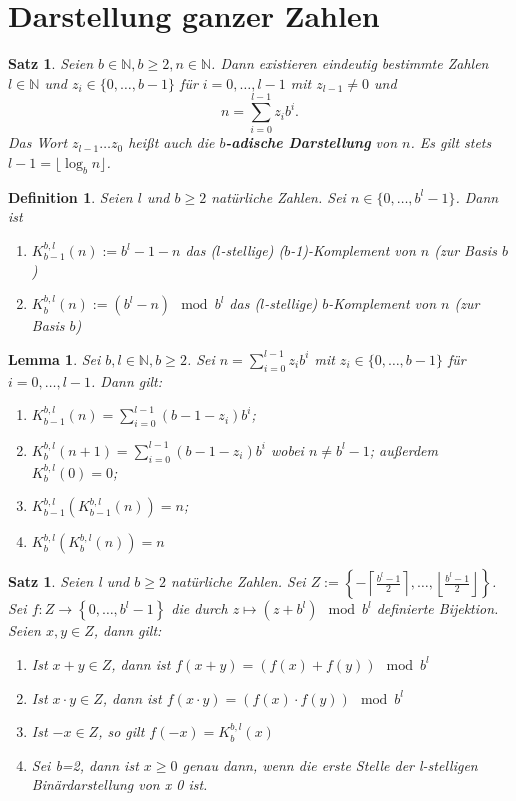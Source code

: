 \documentclass[12pt,a4paper]{article}
\theoremstyle{plain}
\newtheorem{Satz}[Theorem]{Satz}
\newtheorem{Lemma}[Theorem]{Lemma}
\newtheorem{Definition}[Theorem]{Definition}
\newcommand{\herv}[1]{{\emph{\textbf{#1}}}}
\newcommand{\N}{\mathbb{N}}
\numberwithin{equation}{section}
\begin{document}
\section{Darstellung ganzer Zahlen}
\begin{Satz}
Seien $b\in \N, b\geq 2, n\in \N$. Dann existieren eindeutig bestimmte Zahlen $l \in \N$ und $z_i\in\{0,\ldots,b-1\}$ für $i=0,\ldots,l-1$ mit $z_{l-1}\neq 0$ und \\
\[n=\sum_{i=0}^{l-1}{z_ib^i}.\] Das Wort $z_{l-1}\ldots z_0$ heißt auch die \herv{$b$-adische Darstellung} von $n$. Es gilt stets $l-1=\lfloor\log_b n\rfloor$.
\end{Satz}
\begin{Definition}
Seien $l$ und $b\geq 2$ natürliche Zahlen. Sei $n\in \{0,\ldots,b^l-1\}$. Dann ist
\renewcommand{\labelenumi}{\emph{(\alph{enumi})}}
\begin{enumerate}
\item $K_{b-1}^{b,l}(n):=b^l-1-n$ das ($l$-stellige) ($b$-1)-Komplement von $n$ (zur Basis $b$)
\item $K_b^{b,l}(n):=\left(b^l-n\right)\mod b^l$ das ($l$-stellige) $b$-Komplement von $n$ (zur Basis $b$)
\end{enumerate}
\end{Definition}
\begin{Lemma}
Sei $b,l\in\N, b\geq 2$. Sei $n=\sum_{i=0}^{l-1}{z_ib^i}$ mit $z_i\in\{0,\ldots,b-1\}$ für $i=0,\ldots,l-1$. Dann gilt:
\renewcommand{\labelenumi}{\emph{(\roman{enumi})}}
\begin{enumerate}
\item $K_{b-1}^{b,l}(n)=\sum_{i=0}^{l-1}{\left(b-1-z_i\right) b^i}$;
\item $K_b^{b,l}(n+1)=\sum_{i=0}^{l-1}{\left(b-1-z_i\right) b^i}$ wobei $n\neq b^l-1$; außerdem $K_b^{b,l}(0)=0$;
\item $K_{b-1}^{b,l}\left(K_{b-1}^{b,l}(n)\right)=n$;
\item $K_{b}^{b,l}\left(K_{b}^{b,l}(n)\right)=n$
\end{enumerate}
\end{Lemma}
\begin{Satz}
Seien l und $b\geq 2$ natürliche Zahlen. Sei $Z:=\left\lbrace -\left\lceil\frac{b^l-1}{2}\right\rceil,\ldots,\left\lfloor\frac{b^l-1}{2}\right\rfloor\right\rbrace$. \\ Sei $f:Z \rightarrow \left\lbrace 0,\ldots,b^l-1 \right\rbrace$ die durch $z\mapsto \left(z+b^l \right) \mod b^l$ definierte Bijektion. Seien $x,y \in Z$, dann gilt:
\renewcommand{\labelenumi}{\emph{(\alph{enumi})}}
\begin{enumerate}
\item Ist $x+y \in Z$, dann ist $f(x+y)=(f(x)+f(y))\mod b^l$
\item Ist $x\cdot y \in Z$, dann ist $f(x\cdot y)=(f(x)\cdot f(y))\mod b^l$
\item Ist $-x \in Z$, so gilt $f(-x)=K_b^{b,l}(x)$
\item Sei b=2, dann ist $x\geq 0$ genau dann, wenn die erste Stelle der l-stelligen Binärdarstellung von x 0 ist.
\end{enumerate}
\end{Satz}
\end{document}
